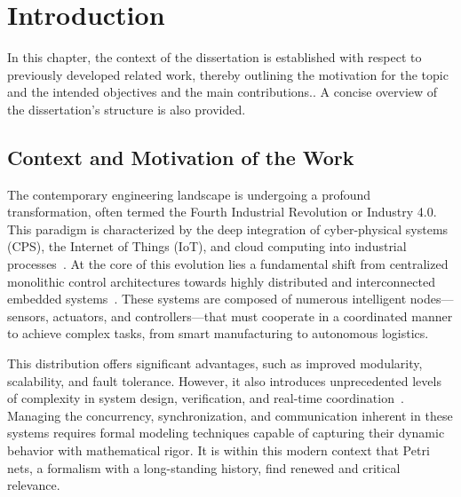 
%

\chapter{Introduction}
\label{cha:introduction}


\epigraphfontsize{\small\itshape}
\setlength\epigraphwidth{12.5cm}
\setlength\epigraphrule{0pt}

In this chapter, the context of the dissertation is established with respect to previously developed related work, thereby outlining the motivation for the topic and the intended objectives and the main contributions.. A concise overview of the dissertation’s structure is also provided.

\section{Context and Motivation of the Work}
\label{sec:context_and_motivation_of_the_work}


The contemporary engineering landscape is undergoing a profound transformation, often termed the Fourth Industrial Revolution or Industry 4.0. This paradigm is characterized by the deep integration of cyber-physical systems (CPS), the Internet of Things (IoT), and cloud computing into industrial processes~\cite{Kagermann2013}. At the core of this evolution lies a fundamental shift from centralized monolithic control architectures towards highly distributed and interconnected embedded systems~\cite{Lee2017}. These systems are composed of numerous intelligent nodes—sensors, actuators, and controllers—that must cooperate in a coordinated manner to achieve complex tasks, from smart manufacturing to autonomous logistics.

This distribution offers significant advantages, such as improved modularity, scalability, and fault tolerance. However, it also introduces unprecedented levels of complexity in system design, verification, and real-time coordination~\cite{AlFuqaha2015}. Managing the concurrency, synchronization, and communication inherent in these systems requires formal modeling techniques capable of capturing their dynamic behavior with mathematical rigor. It is within this modern context that Petri nets, a formalism with a long-standing history, find renewed and critical relevance.

